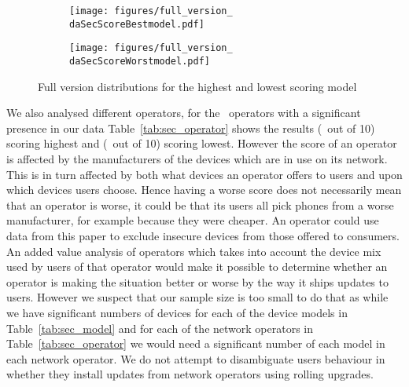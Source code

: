 \begin{figure}
 \centering
 \begin{subfigure}[b]{\columnwidth}
  \texttt{[image: figures/full\_version\_\\daSecScoreBestmodel.pdf]}
  \caption{\daSecScoreBestmodel}
  \label{fig:best_model_full}
 \end{subfigure}
 \begin{subfigure}[b]{\columnwidth}
  \texttt{[image: figures/full\_version\_\\daSecScoreWorstmodel.pdf]}
  \caption{\daSecScoreWorstmodel}
  \label{fig:worst_model_full}
 \end{subfigure}
 \caption{Full version distributions for the highest and lowest scoring model}
\end{figure}

\daTabSecScoresoperator
We also analysed different operators, for the \daNumSigOperators\ operators with a significant presence in our data Table~\ref{tab:sec_operator} shows the results \emph{\daSecScoreBestoperator} (\daSecScoreBestoperatorScore\ out of 10) scoring highest and \emph{\daSecScoreWorstoperator} (\daSecScoreWorstoperatorScore\ out of 10) scoring lowest.
However the score of an operator is affected by the manufacturers of the devices which are in use on its network.
This is in turn affected by both what devices an operator offers to users and upon which devices users choose.
Hence having a worse score does not necessarily mean that an operator is worse, it could be that its users all pick phones from a worse manufacturer, for example because they were cheaper.
An operator could use data from this paper to exclude insecure devices from those offered to consumers.
An added value analysis of operators which takes into account the device mix used by users of that operator would make it possible to determine whether an operator is making the situation better or worse by the way it ships updates to users.
However we suspect that our sample size is too small to do that as while we have significant numbers of devices for each of the device models in Table~\ref{tab:sec_model} and for each of the network operators in Table~\ref{tab:sec_operator} we would need a significant number of each model in each network operator.
We do not attempt to disambiguate users behaviour in whether they install updates from network operators using rolling upgrades.


